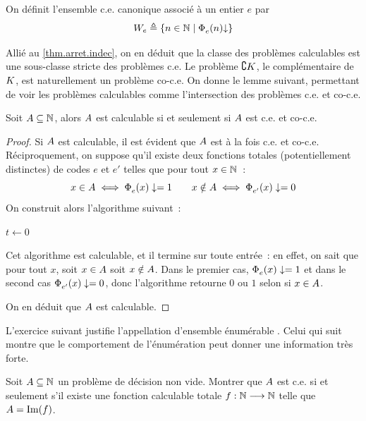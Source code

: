 \begin{definition}
  On définit l'ensemble c.e. canonique associé à un entier $e$ par
  \[W_{e} \triangleq \left\{ n \in \mathbb N \;\middle\vert\; \operatorname{\Phi}_{e}^{}(n)\mathbin{\downarrow} \right\}\]
\end{definition}

Allié au \cref{thm.arret.indec}, on en déduit que la classe des problèmes
calculables est une sous-classe stricte des problèmes c.e. Le problème
$\complement K$, le complémentaire de $K$, est naturellement un problème
co-c.e. On donne le lemme suivant, permettant de voir les problèmes
calculables comme l'intersection des problèmes c.e. et co-c.e.

\begin{lemma}\label{lem.cal.c.e.co.c.e}
  Soit $A \subseteq \mathbb N$, alors $A$ est calculable si et seulement si
  $A$ est c.e. et co-c.e.
\end{lemma}

\begin{proof}
  Si $A$ est calculable, il est évident que $A$ est à la fois c.e. et
  co-c.e. Réciproquement, on suppose qu'il existe deux fonctions totales
  (potentiellement distinctes) de codes $e$ et $e'$ telles que pour tout
  $x \in \mathbb N$~:
  \[x \in A \iff \operatorname{\Phi}_{e}^{}(x) \mathrel{\mathord{\mathbin{\downarrow}}\mathord{=}} 1 \qquad
  x \notin A \iff \operatorname{\Phi}_{e'}^{}(x)\mathrel{\mathord{\mathbin{\downarrow}}\mathord{=}} 0\]
  On construit alors l'algorithme suivant~:
  
  \begin{algorithm}[H]
    $t \leftarrow 0$\;
  \end{algorithm}
  Cet algorithme est calculable, et il termine sur toute entrée~: en effet,
  on sait que pour tout $x$, soit $x \in A$ soit $x \notin A$. Dans le
  premier cas, $\operatorname{\Phi}_{e}^{}(x) \mathrel{\mathord{\mathbin{\downarrow}}\mathord{=}} 1$ et dans le second cas
  $\operatorname{\Phi}_{e'}^{}(x) \mathrel{\mathord{\mathbin{\downarrow}}\mathord{=}} 0$, donc l'algorithme retourne $0$ ou $1$ selon si
  $x \in A$.

  On en déduit que $A$ est calculable.
\end{proof}

L'exercice suivant justifie l'appellation d'ensemble \og énumérable \fg. Celui
qui suit montre que le comportement de l'énumération peut donner une information
très forte.

\begin{exercise}
  Soit $A \subseteq \mathbb N$ un problème de décision non vide. Montrer que
  $A$ est c.e. si et seulement s'il existe une fonction calculable totale
  $f : \displaystyle \mathbb N \longrightarrow \mathbb N$ telle que $A = \operatorname{Im}(f)$.
\end{exercise}

